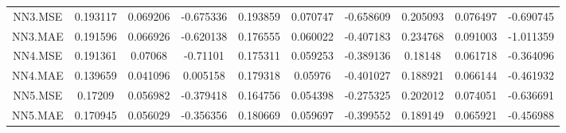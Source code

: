 \begin{longtable}{cccccccccc}
\addlinespace
NN3.MSE & 0.193117 & 0.069206 & -0.675336 & 0.193859 & 0.070747 & -0.658609 & 0.205093 & 0.076497 & -0.690745\\
NN3.MAE & 0.191596 & 0.066926 & -0.620138 & 0.176555 & 0.060022 & -0.407183 & 0.234768 & 0.091003 & -1.011359\\
NN4.MSE & 0.191361 & 0.07068 & -0.71101 & 0.175311 & 0.059253 & -0.389136 & 0.18148 & 0.061718 & -0.364096\\
NN4.MAE & 0.139659 & 0.041096 & 0.005158 & 0.179318 & 0.05976 & -0.401027 & 0.188921 & 0.066144 & -0.461932\\
NN5.MSE & 0.17209 & 0.056982 & -0.379418 & 0.164756 & 0.054398 & -0.275325 & 0.202012 & 0.074051 & -0.636691\\
\addlinespace
NN5.MAE & 0.170945 & 0.056029 & -0.356356 & 0.180669 & 0.059697 & -0.399552 & 0.189149 & 0.065921 & -0.456988\\*
\end{longtable}
\endgroup{}